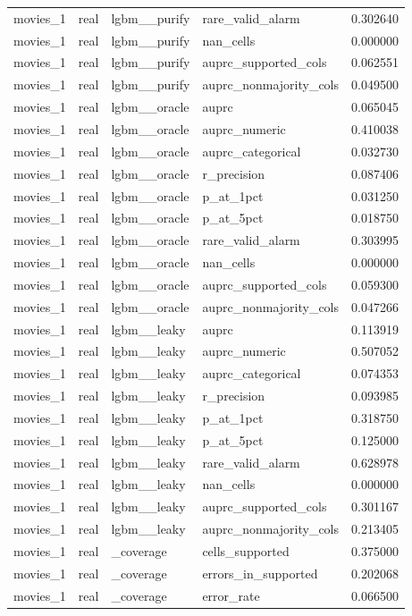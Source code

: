 \begin{tabular}{lllll}
movies\_1 & real & lgbm\_\_purify & rare\_valid\_alarm & 0.302640 \\
movies\_1 & real & lgbm\_\_purify & nan\_cells & 0.000000 \\
movies\_1 & real & lgbm\_\_purify & auprc\_supported\_cols & 0.062551 \\
movies\_1 & real & lgbm\_\_purify & auprc\_nonmajority\_cols & 0.049500 \\
movies\_1 & real & lgbm\_\_oracle & auprc & 0.065045 \\
movies\_1 & real & lgbm\_\_oracle & auprc\_numeric & 0.410038 \\
movies\_1 & real & lgbm\_\_oracle & auprc\_categorical & 0.032730 \\
movies\_1 & real & lgbm\_\_oracle & r\_precision & 0.087406 \\
movies\_1 & real & lgbm\_\_oracle & p\_at\_1pct & 0.031250 \\
movies\_1 & real & lgbm\_\_oracle & p\_at\_5pct & 0.018750 \\
movies\_1 & real & lgbm\_\_oracle & rare\_valid\_alarm & 0.303995 \\
movies\_1 & real & lgbm\_\_oracle & nan\_cells & 0.000000 \\
movies\_1 & real & lgbm\_\_oracle & auprc\_supported\_cols & 0.059300 \\
movies\_1 & real & lgbm\_\_oracle & auprc\_nonmajority\_cols & 0.047266 \\
movies\_1 & real & lgbm\_\_leaky & auprc & 0.113919 \\
movies\_1 & real & lgbm\_\_leaky & auprc\_numeric & 0.507052 \\
movies\_1 & real & lgbm\_\_leaky & auprc\_categorical & 0.074353 \\
movies\_1 & real & lgbm\_\_leaky & r\_precision & 0.093985 \\
movies\_1 & real & lgbm\_\_leaky & p\_at\_1pct & 0.318750 \\
movies\_1 & real & lgbm\_\_leaky & p\_at\_5pct & 0.125000 \\
movies\_1 & real & lgbm\_\_leaky & rare\_valid\_alarm & 0.628978 \\
movies\_1 & real & lgbm\_\_leaky & nan\_cells & 0.000000 \\
movies\_1 & real & lgbm\_\_leaky & auprc\_supported\_cols & 0.301167 \\
movies\_1 & real & lgbm\_\_leaky & auprc\_nonmajority\_cols & 0.213405 \\
movies\_1 & real & \_coverage & cells\_supported & 0.375000 \\
movies\_1 & real & \_coverage & errors\_in\_supported & 0.202068 \\
movies\_1 & real & \_coverage & error\_rate & 0.066500 \\
\hline
\end{tabular}
